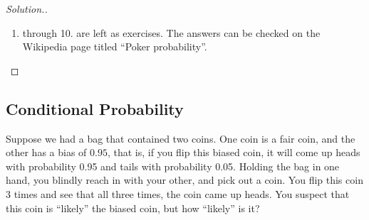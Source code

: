 \documentclass[11pt,letterpaper]{article}
\numberwithin{theorem}{section}
\numberwithin{definition}{section}
\numberwithin{lemma}{section}
\numberwithin{corollary}{section}
\numberwithin{proposition}{section}
\theoremstyle{definition}
\numberwithin{remark}{section}
\numberwithin{claim}{section}
\numberwithin{observation}{section}
\numberwithin{fact}{section}
\numberwithin{assumption}{section}
\numberwithin{example}{section}
\numberwithin{exercise}{section}
\begin{document}
\begin{proof}[Solution.]
\begin{enumerate}
\item through 10. are left as exercises. The answers can be checked on the Wikipedia page titled ``Poker probability''.


\end{enumerate}

\end{proof}


\newpage

\subsection{Conditional Probability}
Suppose we had a bag that contained two coins. One coin is a fair coin, and the other has a bias of $0.95$, that is, if you flip this biased coin, it will come up heads with probability 0.95 and tails with probability 0.05. Holding the bag in one hand, you blindly reach in with your other, and pick out a coin. You flip this coin 3 times and see that all three times, the coin came up heads. You suspect that this coin is ``likely'' the biased coin, but how ``likely'' is it?
\end{document}

